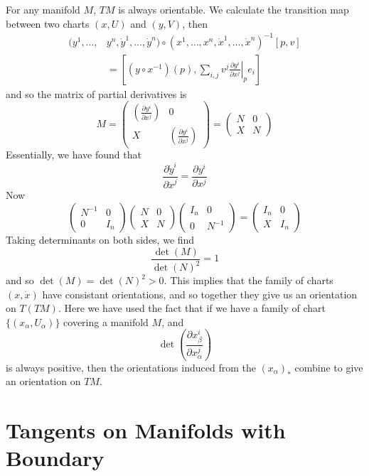 For any manifold $M$, $TM$ is always orientable. We calculate the transition map between two charts $(x,U)$ and $(y,V)$, then
%
\begin{align*}
    (y^1, \dots, &y^n, \dot{y}^1, \dots, \dot{y}^n) \circ (x^1, \dots, x^n, \dot{x}^1, \dots, \dot{x}^n)^{-1}[p, v]\\
    &= \left[ (y \circ x^{-1})(p), \sum_{i,j} v^j \left. \frac{\partial y^i}{\partial x^j} \right|_p e_i \right]
\end{align*}
%
and so the matrix of partial derivatives is
%
\[ M = \begin{pmatrix} \left( \frac{\partial y^i}{\partial x^j} \right) & 0 \\ X & \left( \frac{\partial y^i}{\partial x^j} \right) \end{pmatrix} = \begin{pmatrix} N & 0 \\ X & N \end{pmatrix} \]
%
Essentially, we have found that
%
\[ \frac{\partial \dot{y}^i}{\partial \dot{x}^j} = \frac{\partial y^i}{\partial x^j} \]
%
Now
%
\[ \begin{pmatrix} N^{-1} & 0 \\ 0 & I_n \end{pmatrix} \begin{pmatrix} N & 0 \\ X & N \end{pmatrix} \begin{pmatrix} I_n & 0 \\ 0 & N^{-1} \end{pmatrix} = \begin{pmatrix} I_n & 0 \\ X & I_n \end{pmatrix} \]
%
Taking determinants on both sides, we find
%
\[ \frac{\det(M)}{\det(N)^2} = 1 \]
%
and so $\det(M) = \det(N)^2 > 0$. This implies that the family of charts $(x,\dot{x})$ have consistant orientations, and so together they give us an orientation on $T(TM)$. Here we have used the fact that if we have a family of chart $\{ (x_\alpha, U_\alpha) \}$ covering a manifold $M$, and
%
\[ \det \left(\frac{\partial x^i_\beta}{\partial x^j_\alpha}\right) \]
%
is always positive, then the orientations induced from the $(x_\alpha)_*$ combine to give an orientation on $TM$.

\section{Tangents on Manifolds with Boundary}

